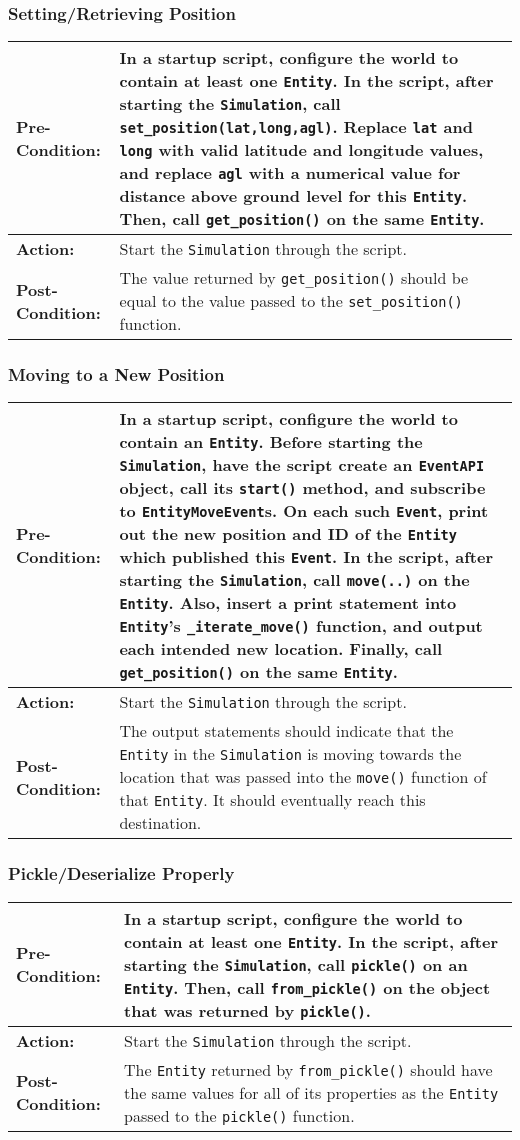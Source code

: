 \documentclass[titlepage]{article}
\newcommand{\testcase}[3]{
    \begin{center}
    \begin{tabular}{| l | p{0.7\textwidth}|}
        \hline
        \rowcolor[gray]{0.8}\textbf{Pre-Condition:} & #1 \\ \hline
        \textbf{Action:} & #2 \\ \hline
        \rowcolor[gray]{0.8}\textbf{Post-Condition:} & #3 \\ \hline
    \end{tabular}
    \end{center}
}
\begin{document}
\subsubsection{Setting/Retrieving Position}
\testcase{In a startup script, configure the world to contain at least one \texttt{Entity}. In the script, after starting the \texttt{Simulation}, call \texttt{set\_position(lat,long,agl)}. Replace \texttt{lat} and \texttt{long} with valid latitude and longitude values, and replace \texttt{agl} with a numerical value for distance above ground level for this \texttt{Entity}. Then, call \texttt{get\_position()} on the same \texttt{Entity}.}{Start the \texttt{Simulation} through the script.}{The value returned by \texttt{get\_position()} should be equal to the value passed to the \texttt{set\_position()} function.}

\subsubsection{Moving to a New Position}
\testcase{In a startup script, configure the world to contain an \texttt{Entity}. Before starting the \texttt{Simulation}, have the script create an \texttt{EventAPI} object, call its \texttt{start()} method, and subscribe to \texttt{EntityMoveEvent}s. On each such \texttt{Event}, print out the new position and ID of the \texttt{Entity} which published this \texttt{Event}. In the script, after starting the \texttt{Simulation}, call \texttt{move(..)} on the \texttt{Entity}. Also, insert a print statement into \texttt{Entity}'s \texttt{\_iterate\_move()} function, and output each intended new location. Finally, call \texttt{get\_position()} on the same \texttt{Entity}.}{Start the \texttt{Simulation} through the script.}{The output statements should indicate that the \texttt{Entity} in the \texttt{Simulation} is moving towards the location that was passed into the \texttt{move()} function of that \texttt{Entity}. It should eventually reach this destination.}

\subsubsection{Pickle/Deserialize Properly}
\testcase{In a startup script, configure the world to contain at least one \texttt{Entity}. In the script, after starting the \texttt{Simulation}, call \texttt{pickle()} on an \texttt{Entity}. Then, call \texttt{from\_pickle()} on the object that was returned by \texttt{pickle()}.}{Start the \texttt{Simulation} through the script.}{The \texttt{Entity} returned by \texttt{from\_pickle()} should have the same values for all of its properties as the \texttt{Entity} passed to the \texttt{pickle()} function.}
\end{document}
